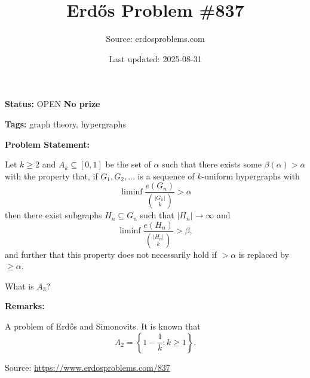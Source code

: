 \documentclass{article}
\title{Erd\H{o}s Problem \#837}
\date{Last updated: 2025-08-31}
\author{Source: erdosproblems.com}
\begin{document}
\maketitle

\noindent\textbf{Status:} OPEN \quad \textbf{No prize}

\noindent\textbf{Tags:} graph theory, hypergraphs

\medskip
\noindent\textbf{Problem Statement:}

Let $k\geq 2$ and $A_k\subseteq [0,1]$ be the set of $\alpha$ such that there exists some $\beta(\alpha)>\alpha$ with the property that, if $G_1,G_2,\ldots$ is a sequence of $k$-uniform hypergraphs with\[\liminf \frac{e(G_n)}{\binom{\lvert G_n\rvert}{k}} >\alpha\]then there exist subgraphs $H_n\subseteq G_n$ such that $\lvert H_n\rvert \to \infty$ and\[\liminf \frac{e(H_n)}{\binom{\lvert H_n\rvert}{k}} >\beta,\]and further that this property does not necessarily hold if $>\alpha$ is replaced by $\geq \alpha$.

What is $A_3$?

\bigskip
\noindent\textbf{Remarks:}

A problem of Erd\H{o}s and Simonovits. It is known that\[A_2 = \left\{ 1-\frac{1}{k} : k\geq 1\right\}.\]

\bigskip
\noindent\small{Source: \url{https://www.erdosproblems.com/837}}
\end{document}
